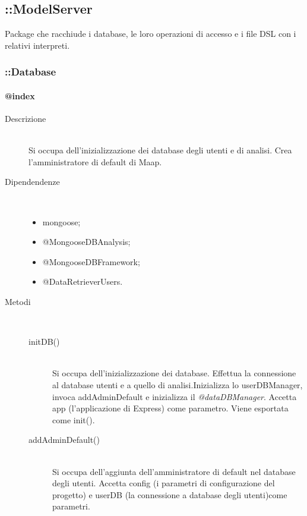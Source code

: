 \subsection{::ModelServer}
Package che racchiude i database, le loro operazioni di accesso e i file 
DSL con i relativi interpreti.

\subsubsection{::Database}
\paragraph{@index}
\begin{description}
 \item[Descrizione] \hfill \\
 Si occupa dell'inizializzazione dei database degli utenti e di analisi. Crea l'amministratore di default di Maap.
 \item[Dipendendenze] \hfill \\
   \begin{itemize}
   \item mongoose;
   \item @MongooseDBAnalysis;
   \item @MongooseDBFramework;
   \item @DataRetrieverUsers.
   \end{itemize}
 \item[Metodi] \hfill \\
 \begin{description}
 \item[initDB()] \hfill \\
 Si occupa dell'inizializzazione dei database. Effettua la connessione al database utenti e a quello di analisi.Inizializza lo userDBManager, invoca addAdminDefault e inizializza il \textit{@dataDBManager}. Accetta app (l'applicazione di Express) come parametro. Viene esportata come init().
  \item[addAdminDefault()] \hfill \\
  Si occupa dell'aggiunta dell'amministratore di default nel database degli utenti. Accetta config (i parametri di configurazione del progetto) e userDB (la connessione a database degli utenti)come parametri.
 \end{description}
\end{description}

